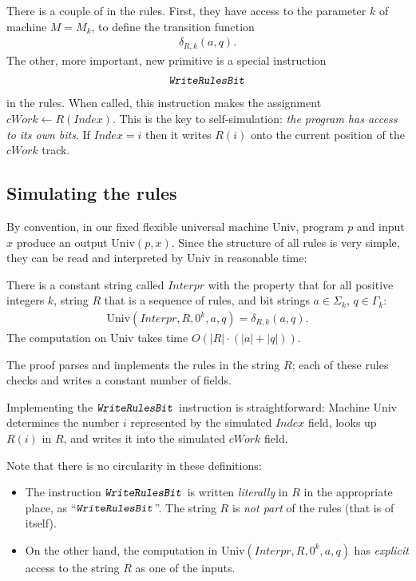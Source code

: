 \documentclass[12pt]{memoir}
\newcommand{\fld}[1]{\ensuremath{\textit{#1}}}
\newcommand{\rul}[1]{\ensuremath{\texttt{\slshape #1\/}}}
\newcommand{\Index}{\fld{Index}}
\newcommand{\cWork}{\fld{cWork}}
\newcommand{\Interpr}{\mathit{Interpr}}
\newcommand{\Un}{\mathrm{Univ}}
\newcommand{\WriteRulesBit}{\rul{WriteRulesBit}}
\begin{document}
There is a couple of  in the rules.
First, they have access to the parameter \( k \) of machine \( M=M_{k} \), 
to define the transition function
 \begin{align*}
            \delta_{R,k}(a,q).
 \end{align*}
The other, more important, new primitive is a special instruction
 \begin{align*}
   \WriteRulesBit
 \end{align*}
in the rules.
When called, this instruction makes the assignment \( \cWork\gets R(\Index) \).
This is the key to self-simulation: \emph{the program has
access to its own bits}.
If \( \Index=i \) then it writes \( R(i) \) onto the current position of the \( \cWork \) track.


\subsection{Simulating the rules}

By convention, in our fixed flexible universal machine \( \Un \),
program \( p \) and input \( x \) produce an output \( \Un(p,x) \).
Since the structure of all rules is very simple, they can be read and
interpreted by \( \Un \) in reasonable time:

\begin{theorem}
There is a constant string called \( \Interpr \) with the property that for
all positive integers \( k \), string \( R \) that is a
sequence of rules, and bit strings \( a\in\Sigma_{k} \), \( q\in \Gamma_{k} \):
 \begin{align*}
  \Un(\Interpr,R,0^{k},a,q)=\delta_{R,k}(a,q).
 \end{align*}
The computation on \( \Un \) takes time \( O(|R|\cdot (|a|+|q|)) \).
\end{theorem}

The proof parses and implements the rules in the string \( R \); each of these rules
checks and writes a constant number of fields.

Implementing the \( \WriteRulesBit \) instruction is straightforward:
Machine \( \Un \) determines the number \( i \)
represented by the simulated \( \Index \) field, 
looks up \( R(i) \) in \( R \), and writes it into the simulated \( \cWork \) field.

Note that there is no circularity in these definitions:
  \begin{itemize}
  \item 
The instruction \( \WriteRulesBit \) is written \emph{literally}
in \( R \) in the appropriate place, as ``\(\WriteRulesBit \)''.
The string \( R \) is \emph{not part} of the rules (that is of itself).  
  \item On the other hand, the computation in
\( \Un(\Interpr,R,0^{k},a, q) \) 
has \emph{explicit} access to the string \( R \) as one of the inputs.
  \end{itemize}
\end{document}
